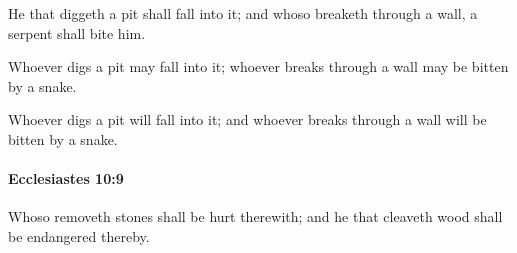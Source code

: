 			\begin{versebox}
					\item[BHS] 
					\item[LXX] 
					\item[ASV] He that diggeth a pit shall fall into it; and whoso breaketh through a wall, a serpent shall bite him.
					\item[NIV] Whoever digs a pit may fall into it; whoever breaks through a wall may be bitten by a snake.
					\item[NRSV] Whoever digs a pit will fall into it; and whoever breaks through a wall will be bitten by a snake.
			\end{versebox}

		\paragraph{Ecclesiastes 10:9} %
			\label{ECCLESIASTES-10-9}

			Whoso removeth stones shall be hurt therewith; and he that cleaveth wood shall be endangered thereby.

